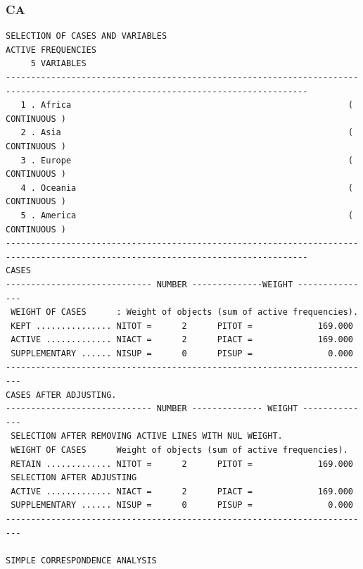 \documentclass[a4paper,10pt,twocolumn]{article}
\begin{document}
\begin{landscape}
\newpage

\newpage
\subsubsection{CA}\label{ca}
\begin{verbatim}
SELECTION OF CASES AND VARIABLES
ACTIVE FREQUENCIES
     5 VARIABLES
----------------------------------------------------------------------------------------------------------------------------------
   1 . Africa                                                       ( CONTINUOUS )
   2 . Asia                                                         ( CONTINUOUS )
   3 . Europe                                                       ( CONTINUOUS )
   4 . Oceania                                                      ( CONTINUOUS )
   5 . America                                                      ( CONTINUOUS )
----------------------------------------------------------------------------------------------------------------------------------
CASES
----------------------------- NUMBER --------------WEIGHT ---------------
 WEIGHT OF CASES      : Weight of objects (sum of active frequencies).
 KEPT ............... NITOT =      2      PITOT =             169.000
 ACTIVE ............. NIACT =      2      PIACT =             169.000
 SUPPLEMENTARY ...... NISUP =      0      PISUP =               0.000
-------------------------------------------------------------------------
CASES AFTER ADJUSTING.
----------------------------- NUMBER -------------- WEIGHT --------------
 SELECTION AFTER REMOVING ACTIVE LINES WITH NUL WEIGHT.
 WEIGHT OF CASES      Weight of objects (sum of active frequencies).
 RETAIN ............. NITOT =      2      PITOT =             169.000
 SELECTION AFTER ADJUSTING
 ACTIVE ............. NIACT =      2      PIACT =             169.000
 SUPPLEMENTARY ...... NISUP =      0      PISUP =               0.000
-------------------------------------------------------------------------

SIMPLE CORRESPONDENCE ANALYSIS


\end{verbatim}
\end{landscape}
\end{document}
